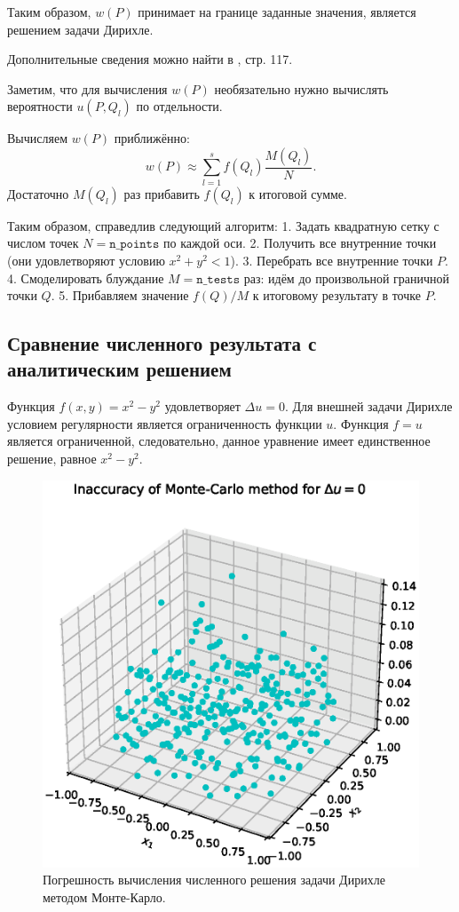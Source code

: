 \documentclass[11pt]{report}
\begin{document}
Таким образом, $w(P)$ принимает на границе заданные значения, является решением задачи Дирихле.

Дополнительные сведения можно найти в \cite{buslenko}, стр. 117.

Заметим, что для вычисления $w(P)$ необязательно нужно вычислять вероятности $u(P,Q_l)$ по отдельности.

Вычисляем $w(P)$ приближённо:
$$
w(P) \approx \sum_{l=1}^s f(Q_l) \frac{M(Q_l)}{N}.
$$
Достаточно $M(Q_l)$ раз прибавить $f(Q_l)$ к итоговой сумме.


Таким образом, справедлив следующий алгоритм:
1. Задать квадратную сетку с числом точек $N=\texttt{n\_points}$ по каждой оси.
2. Получить все внутренние точки (они удовлетворяют условию $x^2+y^2 < 1$).
3. Перебрать все внутренние точки $P$.
4. Смоделировать блуждание $M=\texttt{n\_tests}$ раз: идём до произвольной граничной точки $Q$.
5. Прибавляем значение $f(Q) / M$ к итоговому результату в точке $P$.

\subsection{Сравнение численного результата с аналитическим решением}

Функция $f(x,y)=x^2-y^2$ удовлетворяет $\Delta u=0$. Для внешней задачи Дирихле условием регулярности является ограниченность функции $u$. Функция $f=u$ является ограниченной, следовательно, данное уравнение имеет единственное решение, равное $x^2-y^2$.

\begin{figure}[H]
    \centering
    \includegraphics[width=0.9\linewidth]{images/laplace-error.eps}
    \caption{Погрешность вычисления численного решения задачи Дирихле методом Монте-Карло.}
    \label{fig:laplace-error}
\end{figure}
\end{document}
